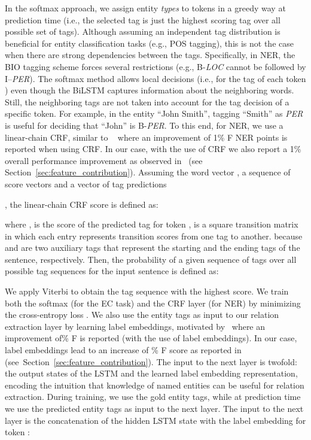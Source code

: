 \documentclass[review]{elsarticle}
\newcommand{\eg}{e.g., }
\newcommand{\ie}{i.e., }
\newcommand{\secref}[1]{Section~\ref{#1}}
\begin{document}
In the softmax approach, we assign entity \emph{types} to tokens in a greedy way at prediction time (\ie the selected tag is just the highest scoring tag over all possible set of tags). Although assuming an independent tag distribution is beneficial for entity classification tasks (\eg POS tagging), this is not the case when there are strong dependencies between the tags. Specifically, in NER, the BIO tagging scheme forces several restrictions (\eg B-\textit{LOC} cannot be followed by I--\textit{PER}). The softmax method allows local decisions (\ie for the tag of each token ) even though the BiLSTM captures information about the neighboring words. Still, the neighboring tags are not taken into account for the tag decision of a specific token. For example, in the entity ``John Smith'', tagging ``Smith'' as \emph{PER} is useful for deciding that ``John'' is B-\emph{PER}. To this end, for NER, we use a linear-chain CRF, similar to ~\cite{lample:16} where an improvement of 1\% F NER points is reported when using CRF. In our case, with the use of CRF we also report a 1\% overall performance improvement as observed in~ (see \secref{sec:feature_contribution}).
Assuming the word vector , a sequence of score vectors 
 and a vector of tag predictions 

, the linear-chain CRF score is defined as:



\noindent where ,  is the score of the predicted tag for token ,  is a square transition matrix
in which each entry represents transition scores from one tag to another. 
 because  and  are two auxiliary tags that represent the starting and the ending tags of the sentence, respectively.
Then, the probability of a given sequence of tags over all possible tag sequences for the input sentence  is defined as:



\noindent We apply Viterbi to obtain the tag sequence  with the highest score. We train both the softmax (for the EC task) and the CRF layer (for NER) by minimizing the cross-entropy loss .
We also use the entity tags as input to our relation extraction layer by learning label embeddings, motivated by~\cite{miwa:16} where an improvement of\% F is reported (with the use of label embeddings). In our case, label embeddings lead to an increase of \% F score as reported in~ (see~\secref{sec:feature_contribution}). The input to the next layer is twofold: the output states of the LSTM and the learned label embedding representation, encoding the intuition that knowledge of named entities can be useful for relation extraction. During training, we use the gold entity tags, while at prediction time we use the predicted entity tags as input to the next layer. The input to the next layer is the concatenation of the hidden LSTM state  with the label embedding  for token :
 
\end{document}
